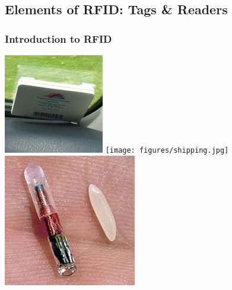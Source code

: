 \documentclass[unknownkeysallowed]{beamer}
\begin{document}
\subsection{Elements of RFID: Tags \& Readers}
\begin{frame}
  \frametitle{Introduction to RFID}
    \begin{center}\begin{minipage}{.9\textwidth}
      \vspace{2mm}
      \begin{center}
        \includegraphics[width=\linewidth,height=0.3\textheight,keepaspectratio]{figures/FasTrak_transponder.jpg}
        \texttt{[image: figures/shipping.jpg]} 
        \includegraphics[width=\linewidth,height=0.3\textheight,keepaspectratio]{figures/Microchip_rfid_rice.jpg}

\end{center}
\end{minipage}
\end{center}
\end{frame}
\end{document}
